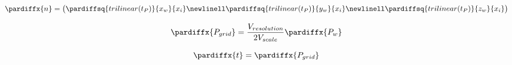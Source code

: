\begin{equation}
\pardiffx{n} =
\begin{pmatrix}
\pardiffsq{trilinear(t_P)}{x_{w}}{x_{i}} \newlinell
\pardiffsq{trilinear(t_P)}{y_{w}}{x_{i}} \newlinell
\pardiffsq{trilinear(t_P)}{z_{w}}{x_{i}}
\end{pmatrix}
\end{equation}

\begin{equation}
\pardiffx{P_{grid}} = \frac{V_{resolution}}{2V_{scale}} \pardiffx{P_{w}}
\end{equation}

\begin{equation}
\pardiffx{t} = \pardiffx{P_{grid}}
\end{equation}
